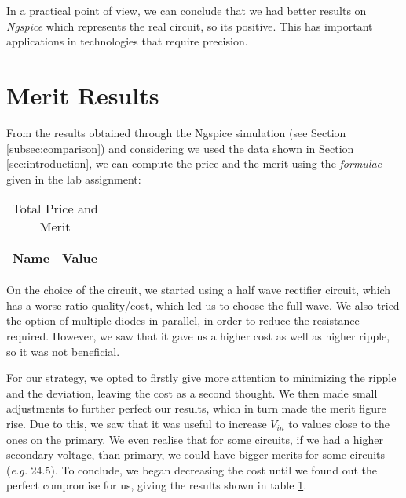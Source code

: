 In a practical point of view, we can conclude that we had better results on \textit{Ngspice} which represents the real circuit, so its positive. This has important applications in technologies that require precision.


\clearpage

\section{Merit Results}
\label{sec:merit}

From the results obtained through the Ngspice simulation (see Section \ref{subsec:comparison}) and considering we used the data shown in Section \ref{sec:introduction}, we can compute the price and the merit using the \textit{formulae} given in the lab assignment:

\begin{table}[h]
    \centering
    \begin{tabular}{|l|c|}
    \hline
    {\bf Name} & {\bf Value} \\ \hline
    
    \end{tabular}
    \caption{Total Price and Merit}
    \label{tab:price_merit}
\end{table}

On the choice of the circuit, we started using a half wave rectifier circuit, which has a worse ratio quality/cost, which led us to choose the full wave. We also tried the option of multiple diodes in parallel, in order to reduce the resistance required.
However, we saw that it gave us a higher cost as well as higher ripple, so it was not beneficial. 

For our strategy, we opted to firstly give more attention to minimizing the ripple and the deviation, leaving the cost as a second thought. We then made small adjustments to further perfect our results, which in turn made the merit figure rise. Due to this, we saw that it was useful to increase $V_{in}$ to values close to the ones on the primary. We even realise that for some circuits, if we had a higher secondary voltage, than primary, we could have bigger merits for some circuits (\textit{e.g.} 24.5). To conclude, we began decreasing the cost until we found out the perfect compromise for us, giving the results shown in table \ref{tab:price_merit}.

